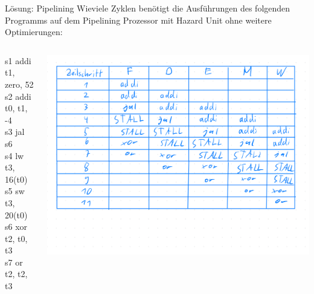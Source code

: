 \documentclass[
  german,            %
  aspectratio=169,    %
]{tumbeamer}
\begin{document}
\begin{frame}[c]{Lösung: Pipelining}{}
	Wieviele Zyklen benötigt die Ausführungen des folgenden Programms auf dem Pipelining Prozessor mit Hazard Unit ohne weitere Optimierungen:  \\
	\vspace{0.5cm}
	\begin{columns}[c]
		\begin{column}{0.5\textwidth}
			s1 \hspace{15mm} addi t1, zero, 52 \\
			s2 \hspace{15mm} addi t0, t1, -4    \\
			s3 \hspace{15mm} jal s6    \\
			s4 \hspace{15mm} lw t3, 16(t0)      \\
			s5 \hspace{15mm} sw t3, 20(t0)      \\
			s6 \hspace{15mm} xor t2, t0, t3     \\
			s7 \hspace{15mm} or t2, t2, t3      \\
				\end{column}
		\begin{column}{0.5\textwidth}
			\begin{center}
				\includegraphics[width=1.0\textwidth]{w14_pipelining.jpeg}
			\end{center}
		\end{column}
	\end{columns}
\end{frame}
\end{document}
